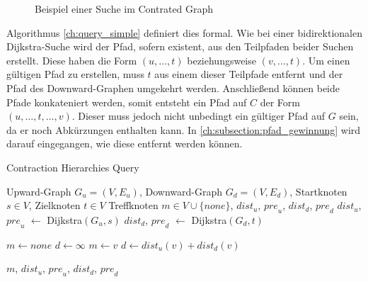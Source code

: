 \begin{figure}[ht]
  \centering
  \caption{Beispiel einer Suche im Contrated Graph}
  \label{fig:ch:beispiel_suche}
\end{figure}

Algorithmus \ref{ch:query_simple} definiert dies formal.
Wie bei einer bidirektionalen Dijkstra-Suche wird der Pfad, sofern existent, aus den Teilpfaden beider Suchen erstellt.
Diese haben die Form $(u, \dotsc, t)$ beziehungsweise $(v, \dotsc, t)$.
Um einen gültigen Pfad zu erstellen, muss $t$ aus einem dieser Teilpfade entfernt und der Pfad des Downward-Graphen umgekehrt werden.
Anschließend können beide Pfade konkateniert werden, somit entsteht ein Pfad auf $C$ der Form $(u, \dotsc, t, \dotsc, v)$.
Dieser muss jedoch nicht unbedingt ein gültiger Pfad auf $G$ sein, da er noch Abkürzungen enthalten kann.
In \autoref{ch:subsection:pfad_gewinnung} wird darauf eingegangen, wie diese entfernt werden können.

\begin{algorithm}[ht]
  \caption{Contraction Hierarchies Query}
  \begin{algorithmic}[1]
    \Require Upward-Graph $G_u = (V, E_u)$, Downward-Graph $G_d = (V, E_d)$, Startknoten $s \in V$, Zielknoten $t \in V$
    \Ensure Treffknoten $m \in V \cup \{ {none} \}$, ${dist}_u$, ${pre}_u$, ${dist}_d$, ${pre}_d$
    \State ${dist}_u$, ${pre}_u$ $\leftarrow$ Dijkstra$(G_u, s)$
    \State ${dist}_d$, ${pre}_d$ $\leftarrow$ Dijkstra$(G_d, t)$

    \State
    \State $m \leftarrow {none}$
    \State $d \leftarrow \infty$
    \State
    \State $m \leftarrow v$
    \State $d \leftarrow {dist}_u(v) + {dist}_d(v)$
    \EndIf
    \EndFor

    \State
    \State \Return $m$, ${dist}_u$, ${pre}_u$, ${dist}_d$, ${pre}_d$
  \end{algorithmic}
  \label{ch:query_simple}
\end{algorithm}

